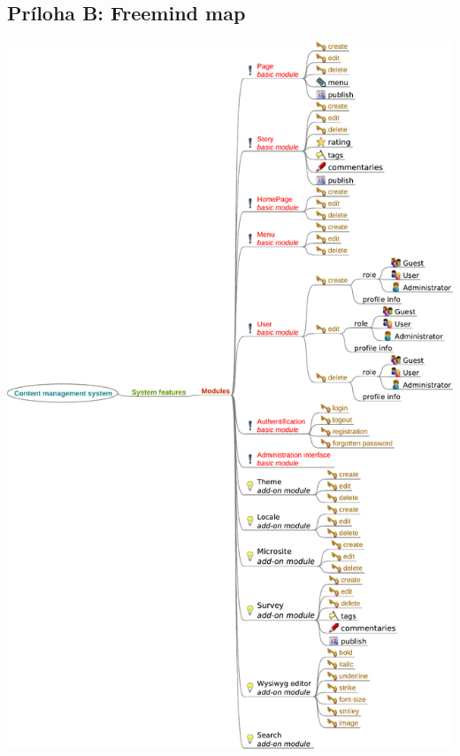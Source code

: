 \documentclass[a4paper,titlepage,11pt]{article}
\begin{document}
\subsection*{Príloha B: Freemind map}
\includegraphics[width=\textwidth]{freemind.pdf}
\end{document}
